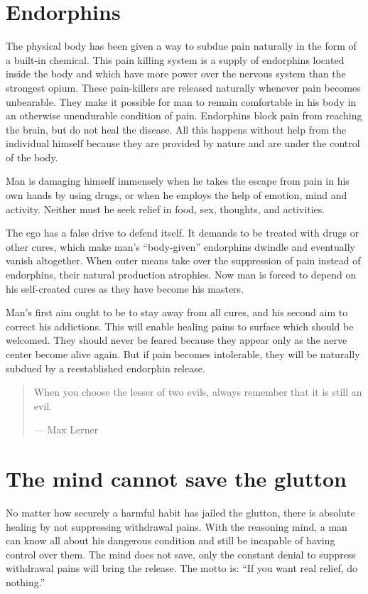 \documentclass[12pt,letterpaper]{article}
\begin{document}
\section{Endorphins}
\label{sec:endo}


The physical body has been given a way to subdue pain naturally in the
form of a built-in chemical. This pain killing system is a supply of
endorphins located inside the body and which have more power over the
nervous system than the strongest opium. These pain-killers are
released naturally whenever pain becomes unbearable. They make it
possible for man to remain comfortable in his body in an otherwise
unendurable condition of pain. Endorphins block pain from reaching the
brain, but do not heal the disease. All this happens without help from
the individual himself because they are provided by nature and are
under the control of the body.

Man is damaging himself immensely when he takes the escape from pain
in his own hands by using drugs, or when he employs the help of
emotion, mind and activity. Neither must he seek relief in food, sex,
thoughts, and activities.

The ego has a false drive to defend itself. It demands to be treated
with drugs or other cures, which make man's ``body-given'' endorphins
dwindle and eventually vanish altogether. When outer means take over
the suppression of pain instead of endorphins, their natural
production atrophies. Now man is forced to depend on his self-created
cures as they have become his masters.

Man's first aim ought to be to stay away from all cures, and his
second aim to correct his addictions. This will enable healing pains to
surface which should be welcomed. They should never be feared because
they appear only as the nerve center become alive again. But if pain
becomes intolerable, they will be naturally subdued by a reestablished
endorphin release.

\begin{quote} When you choose the lesser of two evils, always remember
that it is still an evil.

--- Max Lerner
\end{quote}

\section{The mind cannot save the glutton}
\label{sec:tmcstg}

No matter how securely a harmful habit has jailed the glutton, there is
absolute healing by not suppressing withdrawal pains. With the
reasoning mind, a man can know all about his dangerous condition and
still be incapable of having control over them. The mind does not
save, only the constant denial to suppress withdrawal pains will bring
the release. The motto is: ``If you want real relief, do nothing.''
\end{document}
